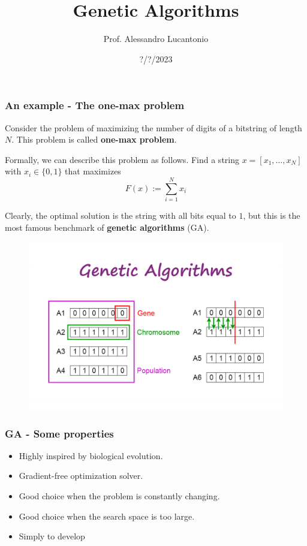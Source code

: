 \documentclass{beamer}
\title{Genetic Algorithms}
\author{Prof. Alessandro Lucantonio}
\institute{Aarhus University - Department of Mechanical and Production Engineering}
\date{?/?/2023}
\begin{document}
	\frame{\titlepage}
	
	\begin{frame}
		\frametitle{An example - The one-max problem}
		Consider the problem of maximizing the number of digits of a bitstring of length $N$. This problem is called \textbf{one-max problem}.
		
		\vspace{5mm}
		
		Formally, we can describe this problem as follows. Find a string $x = [x_1, \dots, x_N]$ with $x_i \in \{0,1\}$ that maximizes 
		\begin{equation*}
			F(x) := \sum_{i=1}^{N} x_i
		\end{equation*}
	
		Clearly, the optimal solution is the string with all bits equal to $1$, but this is the most famous benchmark of \textbf{genetic algorithms} (GA).
	\end{frame}

	\begin{frame}
		\begin{figure}
			\centering
			\includegraphics[scale=0.23]{images/ga}
		\end{figure}
	\end{frame}

	\begin{frame}
		\frametitle{GA - Some properties}
		\begin{itemize}
			\setlength\itemsep{5mm}
			\item Highly inspired by biological evolution.
			\item Gradient-free optimization solver.
			\item Good choice when the problem is constantly changing.
			\item Good choice when the search space is too large.
			\item Simply to develop
		\end{itemize}
	\end{frame}
\end{document}
